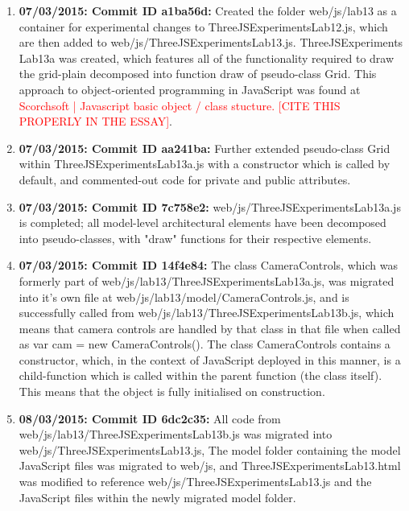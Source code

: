 \begin{enumerate}
\item \textbf{07/03/2015: Commit ID a1ba56d:} Created the folder web/js/lab13 as a container for experimental changes to ThreeJSExperiments\textunderscore Lab12.js, which are then added to web/js/ThreeJSExperiments\textunderscore Lab13.js. ThreeJSExperiments \textunderscore Lab13a was created, which features all of the functionality required to draw the grid-plain decomposed into function draw of pseudo-class Grid. This approach to object-oriented programming in JavaScript was found at \textcolor{red}{Scorchsoft | Javascript basic object / class stucture. [CITE THIS PROPERLY IN THE ESSAY]}.

\item \textbf{07/03/2015: Commit ID aa241ba:} Further extended pseudo-class Grid within ThreeJSExperiments\textunderscore Lab13a.js with a constructor which is called by default, and commented-out code for private and public attributes.

\item \textbf{07/03/2015: Commit ID 7c758e2:} web/js/ThreeJSExperiments\textunderscore Lab13a.js is completed; all model-level architectural elements have been decomposed into pseudo-classes, with "draw" functions for their respective elements.

\item \textbf{07/03/2015: Commit ID 14f4e84:} The class CameraControls, which was formerly part of web/js/lab13/ThreeJSExperiments\textunderscore Lab13a.js, was migrated into it's own file at web/js/lab13/model/CameraControls.js, and is successfully called from web/js/lab13/ThreeJSExperiments\textunderscore Lab13b.js, which means that camera controls are handled by that class in that file when called as \newline var cam = new CameraControls(). The class CameraControls contains a constructor, which, in the context of JavaScript deployed in this manner, is a child-function which is called within the parent function (the class itself). This means that the object is fully initialised on construction.

\item \textbf{08/03/2015: Commit ID 6dc2c35:} All code from web/js/lab13/ThreeJSExperiments\textunderscore Lab13b.js was migrated into web/js/ThreeJSExperiments\textunderscore Lab13.js, The model folder containing the model JavaScript files was migrated to web/js, and ThreeJSExperiments\textunderscore Lab13.html was modified to reference web/js/ThreeJSExperiments\textunderscore Lab13.js and the JavaScript files within the newly migrated model folder.

\end{enumerate}

